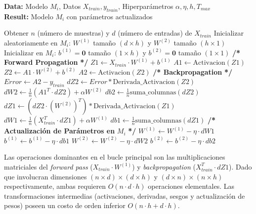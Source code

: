 \documentclass[11pt, a4paper]{article}
\begin{document}
\begin{algorithm}[H]
\caption{Entrenamiento del Perceptrón Multicapa (Entrenar\_MLP)}
\textbf{Data:} Modelo $M_i$, Datos $X_{train}, y_{train}$, Hiperparámetros $\alpha, \eta, h, T_{max}$\\
\textbf{Result:} Modelo $M_i$ con parámetros actualizados
\begin{algorithmic}[1]
    \State Obtener $n$ (número de muestras) y $d$ (número de entradas) de $X_{train}$
    \State Inicializar aleatoriamente en $M_i$: $W^{(1)}$ tamaño $(d \times h)$ y $W^{(2)}$ tamaño $(h \times 1)$
    \State Inicializar en $M_i$: $b^{(1)} = \mathbf{0}$ tamaño $(1 \times h)$ y $b^{(2)} = \mathbf{0}$ tamaño $(1 \times 1)$
    \Statex
        \State \textbf{/* Forward Propagation} \textbf{*/}
        \State $Z1 \gets X_{train} \cdot W^{(1)} + b^{(1)}$
        \State $A1 \gets \text{Activacion}(Z1)$
        \State $Z2 \gets A1 \cdot W^{(2)} + b^{(2)}$ 
        \State $A2 \gets \text{Activacion}(Z2)$
        \Statex
        \State \textbf{/* Backpropagation} \textbf{*/}
        \State $Error \gets A2 - y_{train}$
        \State $dZ2 \gets Error * \text{Derivada\_Activacion}(Z2)$
        \State $dW2 \gets \frac{1}{n} (A1^T \cdot dZ2) + \alpha W^{(2)}$
        \State $db2 \gets \frac{1}{n} \text{suma\_columnas}(dZ2)$
        \Statex
        \State $dZ1 \gets (dZ2 \cdot (W^{(2)})^T) * \text{Derivada\_Activacion}(Z1)$
        \State $dW1 \gets \frac{1}{n} (X_{train}^T \cdot dZ1) + \alpha W^{(1)}$
        \State $db1 \gets \frac{1}{n} \text{suma\_columnas}(dZ1)$
        \Statex
        \State \textbf{/* Actualización de Parámetros en} $M_i$ \textbf{*/}
        \State $W^{(1)} \gets W^{(1)} - \eta \cdot dW1$
        \State $b^{(1)} \gets b^{(1)} - \eta \cdot db1$
        \State $W^{(2)} \gets W^{(2)} - \eta \cdot dW2$
        \State $b^{(2)} \gets b^{(2)} - \eta \cdot db2$
    \EndFor
\end{algorithmic}
\end{algorithm}

Las operaciones dominantes en el bucle principal son las multiplicaciones matriciales del \textit{forward pass} ($X_{train} \cdot W^{(1)}$) y \textit{backpropagation} ($X_{train}^T \cdot dZ1$). Dado que involucran dimensiones $(n \times d) \times (d \times h)$ y $(d \times n) \times (n \times h)$ respectivamente, ambas requieren $O(n \cdot d \cdot h)$ operaciones elementales. Las transformaciones intermedias (activaciones, derivadas, sesgos y actualización de pesos) poseen un costo de orden inferior $O(n \cdot h + d \cdot h)$.
    
\end{document}
